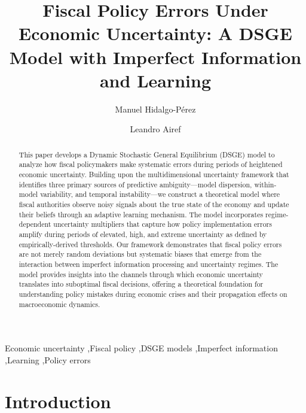 \documentclass[5p,authoryear]{elsarticle}
\begin{document}
\begin{frontmatter}
\title{Fiscal Policy Errors Under Economic Uncertainty: A DSGE Model with Imperfect Information and Learning}    
\author[1]{Manuel Hidalgo-Pérez%
 }
\author[2]{Leandro Airef}

\begin{abstract}
This paper develops a Dynamic Stochastic General Equilibrium (DSGE) model to analyze how fiscal policymakers make systematic errors during periods of heightened economic uncertainty. Building upon the multidimensional uncertainty framework that identifies three primary sources of predictive ambiguity---model dispersion, within-model variability, and temporal instability---we construct a theoretical model where fiscal authorities observe noisy signals about the true state of the economy and update their beliefs through an adaptive learning mechanism. The model incorporates regime-dependent uncertainty multipliers that capture how policy implementation errors amplify during periods of elevated, high, and extreme uncertainty as defined by empirically-derived thresholds. Our framework demonstrates that fiscal policy errors are not merely random deviations but systematic biases that emerge from the interaction between imperfect information processing and uncertainty regimes. The model provides insights into the channels through which economic uncertainty translates into suboptimal fiscal decisions, offering a theoretical foundation for understanding policy mistakes during economic crises and their propagation effects on macroeconomic dynamics.
\end{abstract}

\begin{keyword}
Economic uncertainty \sep Fiscal policy \sep DSGE models \sep Imperfect information \sep Learning \sep Policy errors
\end{keyword}
\end{frontmatter}

\section{Introduction}
\end{document}
